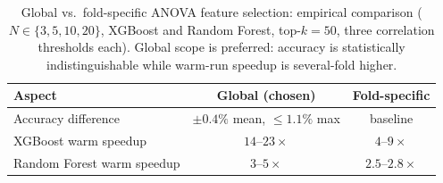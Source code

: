 %
\begin{table}[htbp]
\centering
\caption[Global vs.\ fold-specific ANOVA: condensed summary]{Global vs.\
fold-specific ANOVA feature selection: empirical comparison
($N \in \{3,5,10,20\}$, XGBoost and Random Forest, top-$k=50$, three correlation
thresholds each). Global scope is preferred: accuracy is statistically
indistinguishable while warm-run speedup is several-fold higher.}
\label{tab:global_vs_fold}
\begin{tabular}{lcc}
\toprule
\textbf{Aspect} & \textbf{Global (chosen)} & \textbf{Fold-specific} \\
\midrule
Accuracy difference            & $\pm 0.4\%$ mean, $\leq 1.1\%$ max & baseline \\
XGBoost warm speedup           & $14$--$23\times$                   & $4$--$9\times$ \\
Random Forest warm speedup     & $3$--$5\times$                     & $2.5$--$2.8\times$ \\
\bottomrule
\end{tabular}
\end{table}
